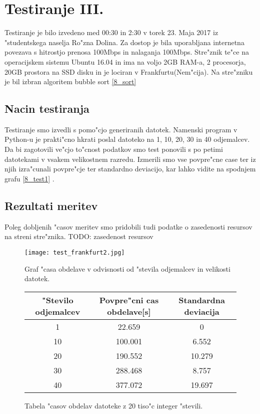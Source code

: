 \section{Testiranje III. }
Testiranje je bilo izvedeno med 00:30 in 2:30 v torek 23. Maja 2017 iz "studentskega naselja Ro"zna Dolina. Za dostop je bila uporabljana internetna povezava s hitrostjo prenosa 100Mbps in nalaganja 100Mbps.
Stre"znik te"ce na operacijskem sistemu Ubuntu 16.04 in ima na voljo 2GB RAM-a, 2 procesorja, 20GB prostora na SSD disku in je lociran v Frankfurtu(Nem"cija). Na stre"zniku je bil izbran algoritem bubble sort \ref{8_sort}

\subsection{Nacin testiranja}
Testiranje smo izvedli s pomo"cjo generiranih datotek. Namenski program v Python-u je prakti"cno hkrati poslal datoteko na 1, 10, 20, 30 in 40 odjemalcev. Da bi zagotovili ve"cjo to"cnost podatkov smo test ponovili s po petimi datotekami v vsakem velikostnem razredu. 
Izmerili smo vse povpre"cne case ter iz njih izra"cunali povpre"cje ter standardno deviacijo, kar lahko vidite na spodnjem grafu  \ref{8_test1} . 

\subsection{Rezultati meritev}
Poleg dobljenih "casov meritev smo pridobili tudi podatke o zasedenosti resursov na streni stre"znika. 
TODO: zasedenost resursov


\begin{figure}
  \centering
    \texttt{[image: test\_frankfurt2.jpg]}
  \caption{Graf "casa obdelave v odvisnosti od "stevila odjemalcev in velikosti datotek.}
  \label{8_graph_frankfurt2}
\end{figure}



\begin{figure}[!htbp]
  \centering
  \begin{tabular}{ | c | c | c | }
    \hline
    "Stevilo odjemalcev & Povpre"cni cas obdelave[s] & Standardna deviacija\\ \hline
    1 & 22.659     & 0 \\ \hline
    10 & 100.001 & 6.552\\ \hline
    20 & 190.552 & 10.279\\ \hline
    30 & 288.468 & 8.757\\ \hline
    40 & 377.072 & 19.697\\ \hline
  \end{tabular}
  \caption{Tabela "casov obdelav datoteke z 20 tiso"c integer "stevili.}
  \label{8_table_sanfrancisco1}
  \centering
\end{figure}




